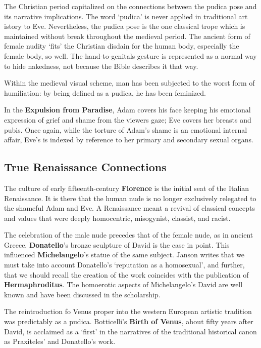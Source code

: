 The Christian period capitalized on the connections between the pudica pose and its narrative implications. The word `pudica' is never applied in traditional art istory to Eve. Nevertheless, the pudica pose is the one classical trope which is maintained without break throughout the medieval period. The ancient form of female nudity `fits' the Christian disdain for the human body, especially the female body, so well. The hand-to-genitals gesture is represented as a normal way to hide nakedness, not because the Bible describes it that way. 

\begin{rmk}
    Within the medieval visual scheme, man has been subjected to the worst form of humiliation: by being defined as a pudica, he has been feminized.
\end{rmk}

In the \textbf{Expulsion from Paradise}, Adam covers his face keeping his emotional expression of grief and shame from the viewers gaze; Eve covers her breasts and pubis. Once again, while the torture of Adam's shame is an emotional internal affair, Eve's is indexed by reference to her primary and secondary sexual organs.

\subsection{True Renaissance Connections}

The culture of early fifteenth-century \textbf{Florence} is the initial seat of the Italian Renaissance. It is there that the human nude is no longer exclusively relegated to the shameful Adam and Eve. A Renaissance meant a revival of classical concepts and values that were deeply homocentric, misogynist, classist, and racist.

The celebration of the male nude precedes that of the female nude, as in ancient Greece. \textbf{Donatello}'s bronze sculpture of David is the case in point. This influenced \textbf{Michelangelo}'s statue of the same subject. Janson writes that we must take into account Donatello's `reputation as a homosexual', and further, that we should recall the creation of the work coincides with the publication of \textbf{Hermaphroditus}. The homoerotic aspects of Michelangelo's David are well known and have been discussed in the scholarship.

The reintroduction fo Venus proper into the western European artistic tradition was predictably as a pudica. Botticelli's \textbf{Birth of Venus}, about fifty years after David, is acclaimed as  a `first' in the narratives of the traditional historical canon as Praxiteles' and Donatello's work.

